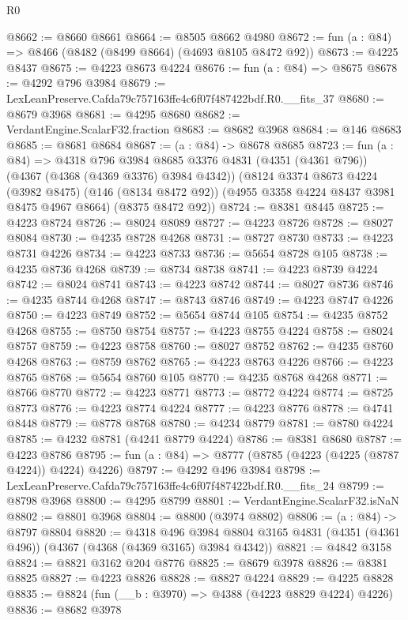 \begin{lexlean}{R0}
\begin{coremodule}
@8662 := @8660 @8661
@8664 := @8505 @8662 @4980
@8672 := fun (a : @84) => @8466 (@8482 (@8499 @8664) (@4693 @8105 @8472 @92))
@8673 := @4225 @8437
@8675 := @4223 @8673 @4224
@8676 := fun (a : @84) => @8675
@8678 := @4292 @796 @3984
@8679 := LexLeanPreserve.Cafda79c757163ffe4c6f07f487422bdf.R0.__fits_37
@8680 := @8679 @3968
@8681 := @4295 @8680
@8682 := VerdantEngine.ScalarF32.fraction
@8683 := @8682 @3968
@8684 := @146 @8683
@8685 := @8681 @8684
@8687 := (a : @84) -> @8678 @8685
@8723 := fun (a : @84) =>
  @4318
    @796
    @3984
    @8685
    @3376
    @4831
    (@4351 (@4361 @796))
    (@4367 (@4368 (@4369 @3376) @3984 @4342))
    (@8124
      @3374
      @8673
      @4224
      (@3982 @8475)
      (@146 (@8134 @8472 @92))
      (@4955 @3358 @4224 @8437 @3981 @8475 @4967 @8664)
      (@8375 @8472 @92))
@8724 := @8381 @8445
@8725 := @4223 @8724
@8726 := @8024 @8089
@8727 := @4223 @8726
@8728 := @8027 @8084
@8730 := @4235 @8728 @4268
@8731 := @8727 @8730
@8733 := @4223 @8731 @4226
@8734 := @4223 @8733
@8736 := @5654 @8728 @105
@8738 := @4235 @8736 @4268
@8739 := @8734 @8738
@8741 := @4223 @8739 @4224
@8742 := @8024 @8741
@8743 := @4223 @8742
@8744 := @8027 @8736
@8746 := @4235 @8744 @4268
@8747 := @8743 @8746
@8749 := @4223 @8747 @4226
@8750 := @4223 @8749
@8752 := @5654 @8744 @105
@8754 := @4235 @8752 @4268
@8755 := @8750 @8754
@8757 := @4223 @8755 @4224
@8758 := @8024 @8757
@8759 := @4223 @8758
@8760 := @8027 @8752
@8762 := @4235 @8760 @4268
@8763 := @8759 @8762
@8765 := @4223 @8763 @4226
@8766 := @4223 @8765
@8768 := @5654 @8760 @105
@8770 := @4235 @8768 @4268
@8771 := @8766 @8770
@8772 := @4223 @8771
@8773 := @8772 @4224
@8774 := @8725 @8773
@8776 := @4223 @8774 @4224
@8777 := @4223 @8776
@8778 := @4741 @8448
@8779 := @8778 @8768
@8780 := @4234 @8779
@8781 := @8780 @4224
@8785 := @4232 @8781 (@4241 @8779 @4224)
@8786 := @8381 @8680
@8787 := @4223 @8786
@8795 := fun (a : @84) => @8777 (@8785 (@4223 (@4225 (@8787 @4224)) @4224) @4226)
@8797 := @4292 @496 @3984
@8798 := LexLeanPreserve.Cafda79c757163ffe4c6f07f487422bdf.R0.__fits_24
@8799 := @8798 @3968
@8800 := @4295 @8799
@8801 := VerdantEngine.ScalarF32.isNaN
@8802 := @8801 @3968
@8804 := @8800 (@3974 @8802)
@8806 := (a : @84) -> @8797 @8804
@8820 := @4318
    @496
    @3984
    @8804
    @3165
    @4831
    (@4351 (@4361 @496))
    (@4367 (@4368 (@4369 @3165) @3984 @4342))
@8821 := @4842 @3158
@8824 := @8821 @3162 @204 @8776
@8825 := @8679 @3978
@8826 := @8381 @8825
@8827 := @4223 @8826
@8828 := @8827 @4224
@8829 := @4225 @8828
@8835 := @8824 (fun (__b : @3970) => @4388 (@4223 @8829 @4224) @4226)
@8836 := @8682 @3978

\end{coremodule}
\end{lexlean}
